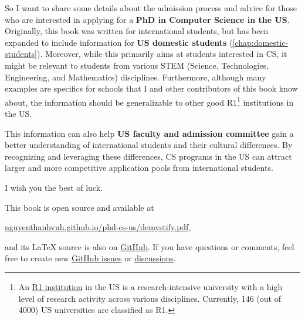 \documentclass[oneside,11pt,dvipsnames]{book}
\begin{document}
So I want to share some details about the admission process and advice for those who are interested in applying for a \textbf{PhD in Computer Science in the US}.
Originally, this book was written for international students, but has been expanded to include information for \textbf{US domestic students} (\autoref{chap:domestic-students}).
Moreover, while this primarily aims at students interested in CS, it might be relevant to students from various STEM (Science, Technologies, Engineering, and Mathematics) disciplines.
Furthermore, although many examples are specifics for schools that I and other contributors of this book know about, the information should be generalizable to other good R1\footnote{An \href{https://en.wikipedia.org/wiki/List_of_research_universities_in_the_United_States}{R1 institution} in the US is a research-intensive university with a high level of research activity across various disciplines. Currently, 146 (out of 4000) US universities are classified as R1.} institutions in the US.

This information can also help \textbf{US faculty and admission committee} gain a better understanding of international students and their cultural differences.  By recognizing and leveraging these differences, CS programs in the US can attract larger and more competitive application pools from international students.

I wish you the best of luck.

\begin{mybox}
This book is open source and available at

\begin{center}
  \href{https://nguyenthanhvuh.github.io/phd-cs-us/demystify.pdf}{nguyenthanhvuh.github.io/phd-cs-us/demystify.pdf},
\end{center}

\noindent and its \LaTeX{} source is also on \href{https://github.com/nguyenthanhvuh/phd-cs-us}{GitHub}. If you have questions or comments, feel free to create new \href{https://github.com/nguyenthanhvuh/phd-cs-us/issues}{GitHub issues} or \href{https://github.com/nguyenthanhvuh/phd-cs-us/discussions}{discussions}.

\end{mybox}

\newpage
\renewcommand{\contentsname}{Contents and Summary}
\tableofcontents
\end{document}
